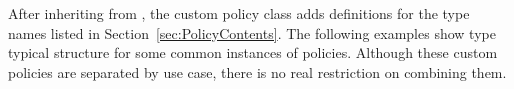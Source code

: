 After inheriting from , the custom policy class adds definitions for the type names listed in Section~\ref{sec:PolicyContents}.
The following examples show type typical structure for some common instances of policies.
Although these custom policies are separated by use case, there is no real restriction on combining them.




